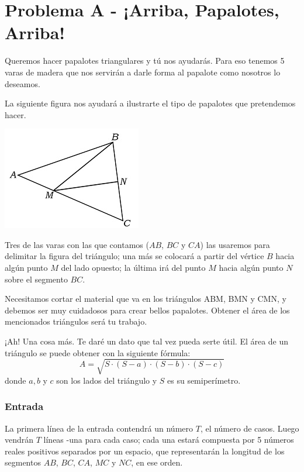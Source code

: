 \chapter*{Problema A - ¡Arriba, Papalotes, Arriba!}

Queremos hacer papalotes triangulares y tú nos
ayudarás. Para eso tenemos 5 varas de madera que nos
servirán a darle forma al papalote como nosotros 
lo deseamos. 

La siguiente figura nos ayudará a ilustrarte el tipo
de papalotes que pretendemos hacer.

\begin{center}
    \includegraphics{images/Triangulo.jpg}
\end{center}

Tres de las varas con las que contamos ($AB$, $BC$ y 
$CA$) las usaremos para delimitar la figura del 
triángulo; una más se colocará a partir del vértice 
$B$ hacia algún punto $M$ del lado opuesto; la 
última irá del punto $M$ hacia algún punto $N$ sobre
el segmento $BC$.

Necesitamos cortar el material que va en los 
triángulos ABM, BMN y CMN,
y debemos ser muy cuidadosos para crear bellos 
papalotes. Obtener el área de los mencionados 
triángulos será tu trabajo.

¡Ah! Una cosa más. Te daré un dato que tal vez pueda
serte útil. El área de un triángulo se puede obtener
con la siguiente fórmula:
$$A = \sqrt{S \cdot (S-a) \cdot (S-b) \cdot (S-c)}$$
donde $a, b$ y $c$ son los lados del triángulo y $S$ es
su semiperímetro.




\subsection*{Entrada}
La primera línea de la entrada contendrá un número $T$, 
el número de casos. Luego vendrán $T$ líneas -una para
cada caso; cada una estará compuesta por 5 números 
reales positivos separados por un espacio, que 
representarán la longitud de los segmentos $AB$, $BC$,
$CA$, $MC$ y $NC$, en ese orden.




